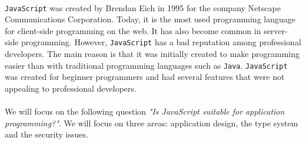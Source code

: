 \paragraph{}
\texttt{JavaScript} was created by Brendan Eich in 1995 for the company Netscape Communications Corporation. Today, it is the most used programming language for client-side programming on the web\cite{w3techs}. It has also become common in server-side programming. However, \texttt{JavaScript} has a bad reputation among professional developers. The main reason is that it was initially created to make programming easier than with traditional programming languages such as \texttt{Java}. \texttt{JavaScript} was created for beginner programmers and had several features that were not appealing to professional developers.
\paragraph{}
We will focus on the following question \emph{"Is JavaScript suitable for application programming?"}. We will focus on three areas: application design, the type system and the security issues.
